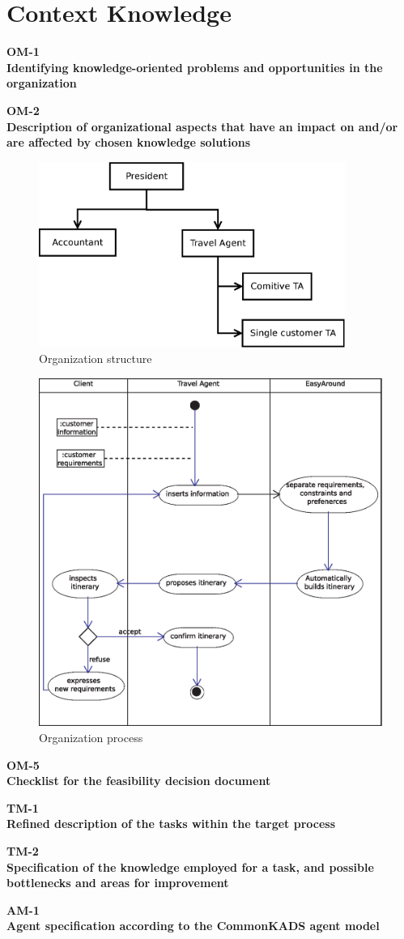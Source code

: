 \documentclass[11pt]{article} %
\def\worksheet#1#2{%
  \begin{center}
  {\large\bf #1} \\
  {\normalsize\bf #2} \\[12pt]
  \begin{footnotesize}
  
  \end{footnotesize}
  \end{center}  
  \vfill}
\begin{document}
\section{Context Knowledge}
\worksheet{OM-1}{Identifying knowledge-oriented problems and
opportunities in the organization}
\worksheet{OM-2}{Description of organizational aspects that
have an impact on and/or are affected by chosen knowledge solutions}
\begin{figure}[H]
\centering
\includegraphics[width=10cm]{images/azienda.eps}
\caption{Organization structure}
\label{fig:orgStructure}
\end{figure}
\begin{figure}[H]
\centering
\includegraphics[width=\textwidth]{images/activity.eps}
\caption{Organization process}
\label{fig:orgProcess}
\end{figure}
\newpage
\worksheet{OM-5}{Checklist for the feasibility decision
document}
\worksheet{TM-1}{Refined description of the tasks within the
target process}
\worksheet{TM-2}{Specification of the knowledge employed for a
task, and possible bottlenecks and areas for improvement}
\worksheet{AM-1}{Agent specification according to the
CommonKADS agent model}
\end{document}
